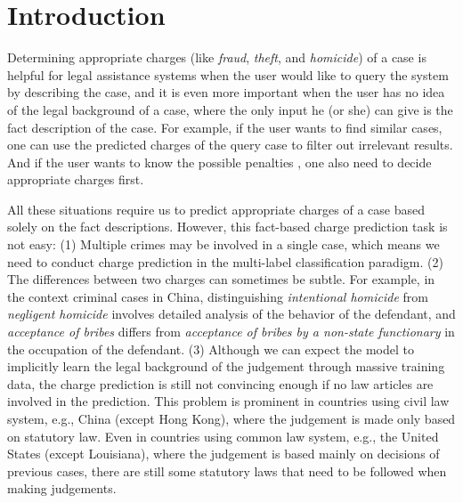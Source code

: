 \section{Introduction}
Determining appropriate charges (like \emph{fraud}, \emph{theft}, and \emph{homicide}) of a case is helpful for legal assistance systems when the user would like to query the system by describing the case, and it is even more important when the user has no idea of the legal background of a case, where the only input he (or she) can give is the fact description of the case. 
For example, if the user wants to find similar cases, one can use the predicted charges of the query case to filter out irrelevant results. And if the user wants to know the possible penalties , one also need to decide appropriate charges first.



All these situations require us to predict appropriate charges of a case based solely on the fact descriptions. 
However, this fact-based charge prediction task is not easy:
(1) Multiple crimes may be involved in a single case, which means we need to conduct charge prediction in the multi-label classification paradigm. 
(2) The differences between two charges can sometimes be subtle. For example, in the context criminal cases in China, distinguishing \emph{intentional homicide} from \emph{negligent homicide} involves detailed analysis of the behavior of the defendant, and \emph{acceptance of bribes} differs from \emph{acceptance of bribes by a non-state functionary} in the occupation of the defendant. 
(3)  Although we can expect the model to implicitly learn the legal background of the judgement through massive training data, the charge prediction is still not convincing enough if no law articles are involved in the prediction. This problem is prominent in countries using civil law system, e.g., China (except Hong Kong), where the judgement is made only based on statutory law. Even in countries using common law system, e.g., the United States (except Louisiana), where the judgement is based mainly on decisions of previous cases, there are still some statutory laws that need to be followed when making judgements. 

